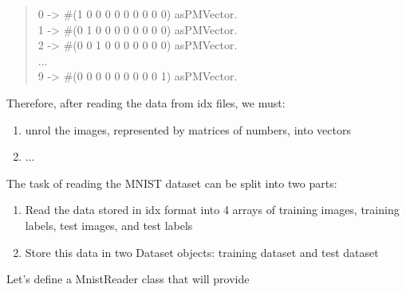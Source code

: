 \begin{quote}
0 -> \#(1 0 0 0 0 0 0 0 0 0) asPMVector.\\
1 -> \#(0 1 0 0 0 0 0 0 0 0) asPMVector.\\
2 -> \#(0 0 1 0 0 0 0 0 0 0) asPMVector.\\
...\\

9 -> \#(0 0 0 0 0 0 0 0 0 1) asPMVector.
\end{quote}

Therefore, after reading the data from idx files, we must:
\begin{enumerate}
  \item unrol the images, represented by matrices of numbers, into vectors
  \item ...
\end{enumerate}

The task of reading the MNIST dataset can be split into two parts:
\begin{enumerate}
  \item Read the data stored in idx format into 4 arrays of training images, training labels, test images, and test labels
  \item Store this data in two Dataset objects: training dataset and test dataset
\end{enumerate}

Let's define a MnistReader class that will provide 
